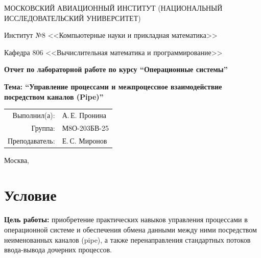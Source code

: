 \documentclass[pdf, unicode, 12pt, a4paper, oneside, fleqn]{article}
\begin{document}
\graphicspath{ {./img/} }



\begin{titlepage}
\begin{center}
\large
МОСКОВСКИЙ АВИАЦИОННЫЙ ИНСТИТУТ (НАЦИОНАЛЬНЫЙ ИССЛЕДОВАТЕЛЬСКИЙ УНИВЕРСИТЕТ)

\vspace{20pt}

Институт №8 <<Компьютерные науки и прикладная математика>>

Кафедра 806 <<Вычислительная математика и программирование>>
\end{center}

\vspace{60pt}

\begin{center}
\bfseries
\large
Отчет по лабораторной работе  по курсу \enquote{Операционные системы}
\end{center}

\vspace{40pt}

\begin{center}
\bfseries
\large
Тема: \enquote{Управление процессами и межпроцессное взаимодействие посредством каналов (Pipe)}
\end{center}

\vfill

\begin{flushright}
\large
\begin{tabular}{rl}
Выполнил(а): & А.\,Е. Пронина \\
Группа: & М8О-203БВ-25 \\
Преподаватель: & Е.\,С. Миронов \\
\end{tabular}
\end{flushright}

\vspace{40pt}

\begin{center}
\large
Москва, \the\year
\end{center}
\end{titlepage}

\pagebreak


\section{Условие}

{\bfseries Цель работы:} приобретение практических навыков управления процессами в операционной системе и обеспечения обмена данными между ними посредством неименованных каналов (pipe), а также перенаправления стандартных потоков ввода-вывода дочерних процессов.
\end{document}
